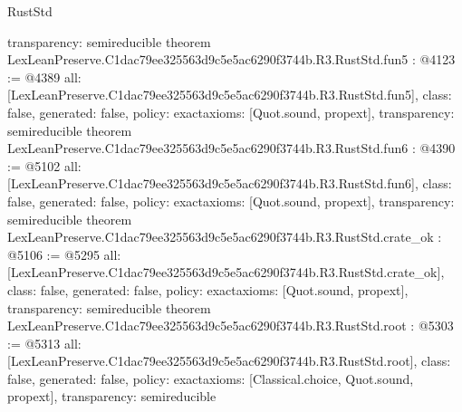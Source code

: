 \begin{lexlean}{RustStd}
\begin{coremodule}
{  transparency: semireducible
}
theorem LexLeanPreserve.C1dac79ee325563d9c5e5ac6290f3744b.R3.RustStd.fun5 : @4123 := @4389 {
  all: [LexLeanPreserve.C1dac79ee325563d9c5e5ac6290f3744b.R3.RustStd.fun5],
  class: false,
  generated: false,
  policy: exact{axioms: [Quot.sound, propext]},
  transparency: semireducible
}
theorem LexLeanPreserve.C1dac79ee325563d9c5e5ac6290f3744b.R3.RustStd.fun6 : @4390 := @5102 {
  all: [LexLeanPreserve.C1dac79ee325563d9c5e5ac6290f3744b.R3.RustStd.fun6],
  class: false,
  generated: false,
  policy: exact{axioms: [Quot.sound, propext]},
  transparency: semireducible
}
theorem LexLeanPreserve.C1dac79ee325563d9c5e5ac6290f3744b.R3.RustStd.crate_ok : @5106 := @5295 {
  all: [LexLeanPreserve.C1dac79ee325563d9c5e5ac6290f3744b.R3.RustStd.crate_ok],
  class: false,
  generated: false,
  policy: exact{axioms: [Quot.sound, propext]},
  transparency: semireducible
}
theorem LexLeanPreserve.C1dac79ee325563d9c5e5ac6290f3744b.R3.RustStd.root : @5303 := @5313 {
  all: [LexLeanPreserve.C1dac79ee325563d9c5e5ac6290f3744b.R3.RustStd.root],
  class: false,
  generated: false,
  policy: exact{axioms: [Classical.choice, Quot.sound, propext]},
  transparency: semireducible
}


\end{coremodule}
\end{lexlean}
